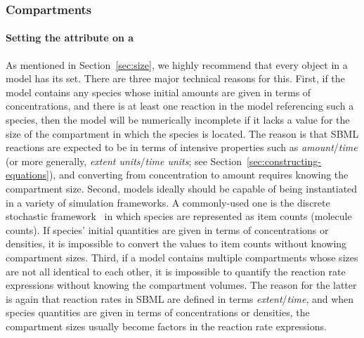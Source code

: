 

\subsubsection{Compartments}
\label{sec:bp:compartment}


\paragraph{Setting the  attribute on a }
\label{sec:bp:size}

As mentioned in Section~\ref{sec:size}, we highly recommend that
every \Compartment object in a model has its  set.
There are three major technical reasons for this.  First, if the
model contains any species whose initial amounts are given in
terms of concentrations, and there is at least one reaction in the
model referencing such a species, then the model will be
numerically incomplete if it lacks a value for the size of the
compartment in which the species is located.  The reason is that
SBML reactions are expected to be in terms of intensive properties
such as \emph{amount}/\emph{time} (or more generally, \emph{extent
  units}/\emph{time units}; see
Section~\ref{sec:constructing-equations}), and converting from
concentration to amount requires knowing the compartment size.
Second, models ideally should be capable of being instantiated in
a variety of simulation frameworks.  A commonly-used one is the
discrete stochastic
framework~\citep{gillespie:1977,wilkinson_2006} in which species
are represented as item counts (\eg molecule counts).  If species'
initial quantities are given in terms of concentrations or
densities, it is impossible to convert the values to item counts
without knowing compartment sizes.  Third, if a model contains
multiple compartments whose sizes are not all identical to each
other, it is impossible to quantify the reaction rate expressions
without knowing the compartment volumes.  The reason for the
latter is again that reaction rates in SBML are defined in terms
\emph{extent}/\emph{time}, and when species quantities are given
in terms of concentrations or densities, the compartment sizes
usually become factors in the reaction rate expressions.


